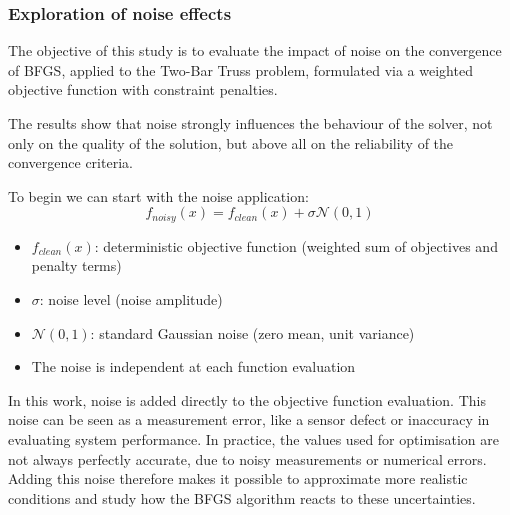 \subsubsection{Exploration of noise effects}
The objective of this study is to evaluate the impact of noise on the convergence of BFGS, applied to the Two-Bar Truss problem, formulated via a weighted objective function with constraint penalties.

The results show that noise strongly influences the behaviour of the solver, not only on the quality of the solution, but above all on the reliability of the convergence criteria.

\begin{table}[H]
    \centering
    \caption{Noise Classification}
    \label{tab:truss_noise_class}
\end{table}

To begin we can start with the noise application:
\begin{equation}
f_{noisy}(x) = f_{clean}(x) + \sigma \mathcal{N}(0,1)
\end{equation}
\begin{itemize}
    \item $f_{clean}(x)$: deterministic objective function (weighted sum of objectives and penalty terms)
    \item $\sigma$: noise level (noise amplitude)
    \item $\mathcal{N}(0,1)$: standard Gaussian noise (zero mean, unit variance)
    \item The noise is independent at each function evaluation
\end{itemize}

In this work, noise is added directly to the objective function evaluation. This noise can be seen as a measurement error, like a sensor defect or inaccuracy in evaluating system performance. In practice, the values used for optimisation are not always perfectly accurate, due to noisy measurements or numerical errors. Adding this noise therefore makes it possible to approximate more realistic conditions and study how the BFGS algorithm reacts to these uncertainties.

